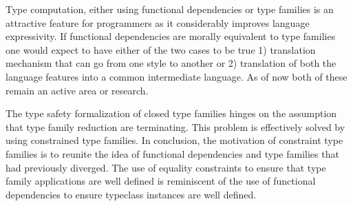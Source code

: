 \documentclass[format=acmsmall,manuscript,review,screen,nonacm,margin=1in,11pt]{acmart}
\begin{document}
Type computation, either using functional dependencies or type families
is an attractive feature for programmers as it considerably improves language expressivity.
If functional dependencies are morally equivalent to type families
one would expect to have either of the two cases to be true
1) translation mechanism that can go from one style to another or 2)
translation of both the language features into a common intermediate language.
As of now both of these remain an active area or research\cite{karachalias_elaboration_2017,sulzmann_understanding_2007}.

The type safety formalization of closed type families hinges on the assumption that
type family reduction are terminating. This problem is effectively solved by using constrained type families.
In conclusion, the motivation of constraint type families is to reunite
the idea of functional dependencies and type families that had previously diverged.
The use of equality constraints to ensure that type family applications are well defined
is reminiscent of the use of functional dependencies to ensure typeclass instances are well defined.
\newpage


\end{document}
